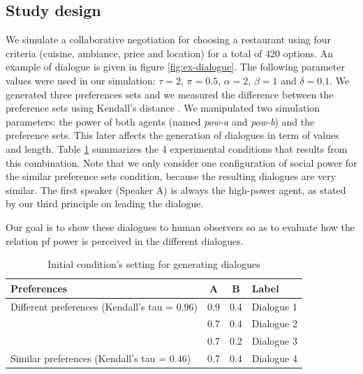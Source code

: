 \documentclass{llncs}
\begin{document}
		\subsection{Study design}
		We simulate a collaborative negotiation for choosing a restaurant using four criteria (cuisine, ambiance, price and location) for a total of 420 options. An example of dialogue is given in figure \ref{fig:ex-dialogue}. The following parameter values were used in our simulation: $\tau=2$, $\pi=0.5$, $\alpha=2$, $\beta=1$ and $\delta=0.1$. We generated three preferences sets and we measured the difference between the preference sets using Kendall's distance \cite{bra2013Kendall}. We manipulated two simulation parameters: the power of both agents (named \emph{pow-a} and \emph{pow-b}) and the preference sets. This later affects the generation of dialogues in term of values and length.  Table \ref{table:conditions} summarizes the 4 experimental conditions that results from this combination. Note that we only consider one configuration of social power for the similar preference sets condition, because the resulting dialogues are very similar. The first speaker (Speaker A) is always the high-power agent, as stated by our  third principle on leading the dialogue.
		
		Our goal is to show these dialogues to human observers so as to evaluate how the relation pf power is perceived in the different dialogues.
		\begin{table}
			\centering
			\begin{tabular}{ |l|c|c|l| }
				\hline
				\textbf{Preferences}& \textbf{A} & \textbf{B} & \textbf{Label} \\ 
				\hline
				\newline\multirow{3}{*} {Different preferences (Kendall's tau = $0.96$)} & 0.9 & 0.4 & Dialogue 1 \\ \cline{2-4}
				
				\newline  & 0.7 & 0.4 & Dialogue 2\\ \cline{2-4}
				
				\newline   &0.7 & 0.2 & Dialogue 3\\ 
				\hline
				\newline Similar preferences (Kendall's tau = $0.46$) & 0.7 & 0.4 & Dialogue 4\\
				\hline
			\end{tabular}
			\caption{Initial condition's setting for generating dialogues} 
			\label{table:conditions}
		\end{table}
		
\end{document}
